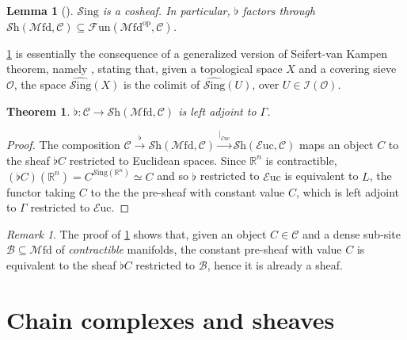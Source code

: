 \documentclass[a4paper]{book}
\newcommand{\lB}{\mathcal{B}}
\newcommand{\lC}{\mathcal{C}}
\newcommand{\lE}{\mathcal{E}}
\newcommand{\lF}{\mathcal{F}}
\newcommand{\lI}{\mathcal{I}}
\newcommand{\lM}{\mathcal{M}}
\newcommand{\rO}{\mathscr{O}}
\newcommand{\bR}{\mathbb{R}}
\newcommand{\lS}{\mathcal{S}}
\newcommand{\op}{\mathrm{op}}
\newcommand{\Fun}{\lF\mathrm{un}} %
\newcommand{\Shv}{\lS\mathrm{h}} %
\newcommand{\Sing}{\lS\mathrm{ing}} %
\newcommand{\Euc}{\lE\mathrm{uc}} %
\newcommand{\Mfd}{\lM\mathrm{fd}} %
\newtheorem{theorem}[equation]{Theorem}
\newtheorem{lemma}[equation]{Lemma}
\theoremstyle{definition}
\theoremstyle{remark}
\newtheorem{remark}[equation]{Remark}
\numberwithin{equation}{section}
\begin{document}
\begin{lemma}[{\cite[Corollary 6.46]{bunkegepner2021differential}}]\label{lem:flatsheaf}
  $\Sing$ is a cosheaf. In particular,
  $\flat$ factors through $\Shv(\Mfd,\lC)\subseteq\Fun(\Mfd^{\op},\lC)$.
\end{lemma}
\cref{lem:flatsheaf} is essentially the consequence of a generalized version of Seifert-van Kampen theorem, namely \cite[Proposition A.3.2]{lurie2017ha}, stating that, given a topological space $X$ and a covering sieve $\rO$, the space $\widehat{\Sing}(X)$ is the colimit of $\widehat{\Sing}(U)$, over $U\in\lI(\rO)$.
\begin{theorem}\label{thm:leftadjoint}
  $\flat:\lC\to\Shv(\Mfd,\lC)$ is left adjoint to $\Gamma$.
\end{theorem}
\begin{proof}
  The composition $\lC\xrightarrow{\flat}\Shv(\Mfd,\lC)\xrightarrow{|_{\Euc}}\Shv(\Euc,\lC)$ maps an object $C$ to the sheaf $\flat C$ restricted to Euclidean spaces. Since $\bR^n$ is contractible, $(\flat C)(\bR^n)=C^{\Sing(\bR^n)}\simeq C$ and so $\flat$ restricted to $\Euc$ is equivalent to $L$, the functor taking $C$ to the the pre-sheaf with constant value $C$, which is left adjoint to $\Gamma$ restricted to $\Euc$.
\end{proof}
\begin{remark}\label{rmk:constsheaf}
  The proof of \cref{thm:leftadjoint} shows that, given an object $C\in\lC$ and a dense sub-site $\lB\subseteq\Mfd$ of \emph{contractible} manifolds, the constant pre-sheaf with value $C$ is equivalent to the sheaf $\flat C$ restricted to $\lB$, hence it is already a sheaf. 
\end{remark}

\section{Chain complexes and sheaves}
\end{document}
